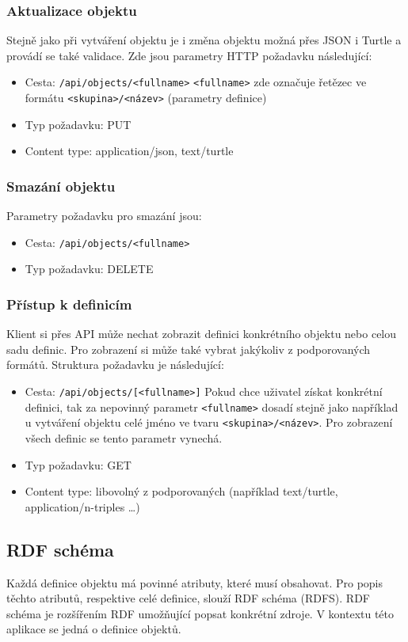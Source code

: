 \documentclass[thesis=B,czech]{FITthesis}[2012/06/26]
\begin{document}
  \subsubsection{Aktualizace objektu}
  Stejně jako při vytváření objektu je i změna objektu možná přes JSON i Turtle a provádí se také validace.
  Zde jsou parametry HTTP požadavku následující:
  \begin{itemize}
   \item Cesta: \texttt{/api/objects/<fullname>}
    \subitem \texttt{<fullname>} zde označuje řetězec ve formátu \texttt{<skupina>/<název>} (parametry definice)
   \item Typ požadavku: PUT
   \item Content type: application/json, text/turtle
  \end{itemize}

  \subsubsection{Smazání objektu}
  Parametry požadavku pro smazání jsou:
  \begin{itemize}
   \item Cesta: \texttt{/api/objects/<fullname>}
   \item Typ požadavku: DELETE
  \end{itemize}
  
  \subsubsection{Přístup k definicím}
  Klient si přes API může nechat zobrazit definici konkrétního objektu nebo celou sadu definic. Pro zobrazení si může také
  vybrat jakýkoliv z podporovaných formátů.
  Struktura požadavku je následující:
  \begin{itemize}
   \item Cesta: \texttt{/api/objects/[<fullname>]}
    \subitem Pokud chce uživatel získat konkrétní definici, tak za nepovinný parametr \texttt{<fullname>} dosadí stejně jako například u vytváření objektu
    celé jméno ve tvaru \texttt{<skupina>/<název>}. Pro zobrazení všech definic se tento parametr vynechá.
   \item Typ požadavku: GET
   \item Content type: libovolný z podporovaných (například text/turtle, application/n-triples \ldots)
  \end{itemize}
  
  \subsection{RDF schéma}
  Každá definice objektu má povinné atributy, které musí obsahovat. Pro popis těchto atributů, respektive celé definice, slouží RDF schéma (RDFS).
  RDF schéma je rozšířením RDF umožňující popsat konkrétní zdroje. V kontextu této aplikace se jedná o definice objektů.
  
\end{document}
